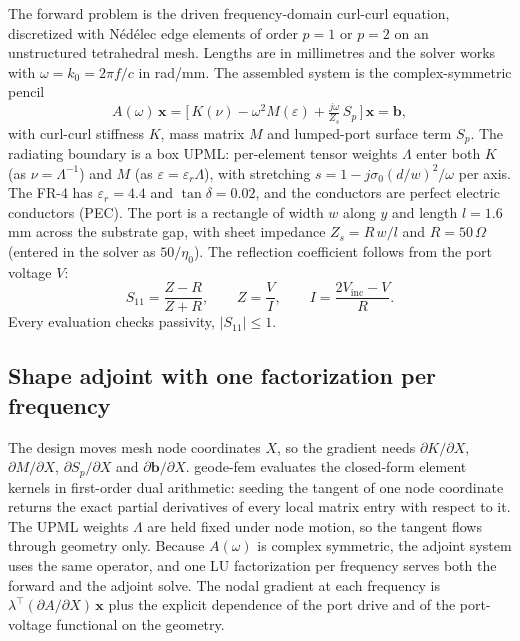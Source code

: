 \documentclass{anvil-paper}
\begin{document}
The forward problem is the driven frequency-domain curl-curl equation,
discretized with N\'ed\'elec edge elements of order $p = 1$ or $p = 2$ on
an unstructured tetrahedral mesh. Lengths are in millimetres and the
solver works with $\omega = k_0 = 2\pi f/c$ in rad/mm. The assembled system
is the complex-symmetric pencil
\begin{equation}
  A(\omega)\,\mathbf{x}
  = \Big[\,K(\nu) - \omega^2 M(\varepsilon) + \tfrac{j\omega}{Z_s}\,S_p\,\Big]\,\mathbf{x}
  = \mathbf{b},
  \label{eq:pencil}
\end{equation}
with curl-curl stiffness $K$, mass matrix $M$ and lumped-port surface
term $S_p$. The radiating boundary is a box UPML: per-element tensor
weights $\Lambda$ enter both $K$ (as $\nu = \Lambda^{-1}$) and $M$ (as
$\varepsilon = \varepsilon_r \Lambda$), with stretching
$s = 1 - j\sigma_0 (d/w)^2/\omega$ per axis. The FR-4 has
$\varepsilon_r = 4.4$ and $\tan\delta = 0.02$, and the conductors are
perfect electric conductors (PEC). The port is a rectangle of width $w$
along $y$ and length $l = 1.6$\,mm across the substrate gap, with sheet
impedance $Z_s = R\,w/l$ and $R = 50\,\Omega$ (entered in the solver as
$50/\eta_0$). The reflection coefficient follows from the port voltage $V$:
\begin{equation}
  S_{11} = \frac{Z - R}{Z + R},\qquad Z = \frac{V}{I},\qquad
  I = \frac{2V_{\mathrm{inc}} - V}{R}.
  \label{eq:s11}
\end{equation}
Every evaluation checks passivity, $|S_{11}| \le 1$.

\subsection{Shape adjoint with one factorization per frequency}
\label{sec:adjoint}

The design moves mesh node coordinates $X$, so the gradient needs
$\partial K/\partial X$, $\partial M/\partial X$, $\partial S_p/\partial X$
and $\partial \mathbf{b}/\partial X$. geode-fem evaluates the closed-form
element kernels in first-order dual arithmetic: seeding the tangent of one
node coordinate returns the exact partial derivatives of every local
matrix entry with respect to it. The UPML weights $\Lambda$ are held fixed
under node motion, so the tangent flows through geometry only. Because
$A(\omega)$ is complex symmetric, the adjoint system uses the same
operator, and one LU factorization per frequency serves both the forward
and the adjoint solve. The nodal gradient at each frequency is
$\lambda^{\top}(\partial A/\partial X)\,\mathbf{x}$ plus the explicit
dependence of the port drive and of the port-voltage functional on the
geometry.
\end{document}
